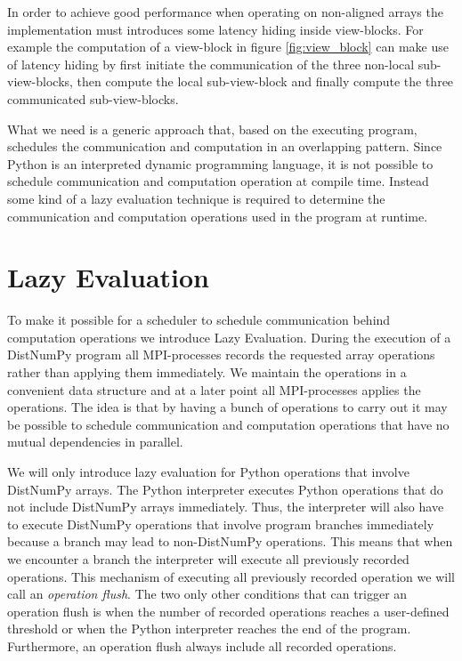 \documentclass[preprint]{../PGAS10/sigplanconf}
\begin{document}
In order to achieve good performance when operating on non-aligned arrays the implementation must introduces some latency hiding inside view-blocks. For example the computation of a view-block in figure \ref{fig:view_block} can make use of latency hiding by first initiate the communication of the three non-local sub-view-blocks, then compute the local sub-view-block and finally compute the three communicated sub-view-blocks. 

What we need is a generic approach that, based on the executing program, schedules the communication and computation in an overlapping pattern. Since Python is an interpreted dynamic programming language, it is not possible to schedule communication and computation operation at compile time. Instead some kind of a lazy evaluation technique is required to determine the communication and computation operations used in the program at runtime.


\section{Lazy Evaluation}
To make it possible for a scheduler to schedule communication behind computation operations we introduce Lazy Evaluation. During the execution of a DistNumPy program all MPI-processes records the requested array operations rather than applying them immediately. We maintain the operations in a convenient data structure and at a later point all MPI-processes applies the operations. The idea is that by having a bunch of operations to carry out it may be possible to schedule communication and computation operations that have no mutual dependencies in parallel.

We will only introduce lazy evaluation for Python operations that involve DistNumPy arrays. The Python interpreter executes Python operations that do not include DistNumPy arrays immediately. Thus, the interpreter will also have to execute DistNumPy operations that involve program branches immediately because a branch may lead to non-DistNumPy operations. This means that when we encounter a branch the interpreter will execute all previously recorded operations. This mechanism of executing all previously recorded operation we will call an \emph{operation flush}. The two only other conditions that can trigger an operation flush is when the number of recorded operations reaches a user-defined threshold or when the Python interpreter reaches the end of the program. Furthermore, an operation flush always include all recorded operations.
\end{document}
